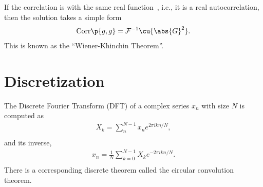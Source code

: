 \documentclass[11pt, a4paper]{article}
\begin{document}
If the correlation is with the same real function~\cite{Press1992}, i.e., it is a real autocorrelation,
then the solution takes a simple form
\begin{equation}\begin{aligned}
    \text{Corr}\p{g, g} = \mathcal{F}^{-1} \cu{\abs{G}^{2}}.
\end{aligned}\end{equation}
This is known as the ``Wiener-Khinchin Theorem''.

\section{Discretization}
The Discrete Fourier Transform (DFT) of a complex series $x_{n}$ with size $N$ is computed as
\begin{equation}\begin{aligned}
    X_{k} = \sum_{n}^{N-1} x_{n} e^{2 \pi i k n / N}, \\
\end{aligned}\end{equation}
and its inverse,
\begin{equation}\begin{aligned}
    x_{n} = \frac{1}{N}\sum_{k=0}^{N-1} X_{k} e^{-2 \pi i k n /N}. \\
\end{aligned}\end{equation}
There is a corresponding discrete theorem called the circular convolution theorem.
\end{document}
